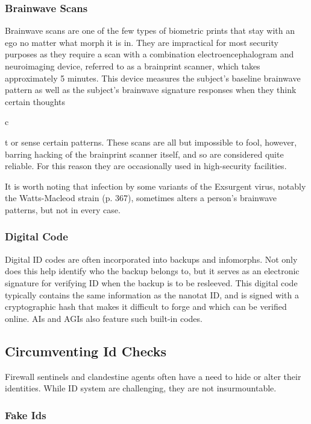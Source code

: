 \subsubsection{Brainwave Scans}

Brainwave scans are one of the few types of biometric 
prints that stay with an ego no matter what morph it 
is in. They are impractical for most security purposes 
as they require a scan with a combination electroencephalogram
and neuroimaging device, referred to as
a brainprint scanner, which takes approximately 5 
minutes. This device measures the subject's baseline 
brainwave pattern as well as the subject's brainwave 
signature responses when they think certain thoughts 

c

t
or sense certain patterns. These scans are all but 
impossible to fool, however, barring hacking of the 
brainprint scanner itself, and so are considered quite 
reliable. For this reason they are occasionally used in 
high-security facilities.

It is worth noting that infection by some variants 
of the Exsurgent virus, notably the Watts-Macleod 
strain (p. 367), sometimes alters a person's brainwave 
patterns, but not in every case.

\subsubsection{Digital Code}

Digital ID codes are often incorporated into backups and 
infomorphs. Not only does this help identify who the 
backup belongs to, but it serves as an electronic signature 
for verifying ID when the backup is to be resleeved. This 
digital code typically contains the same information as 
the nanotat ID, and is signed with a cryptographic hash 
that makes it difficult to forge and which can be verified 
online. AIs and AGIs also feature such built-in codes.

\subsection{Circumventing Id Checks}

Firewall sentinels and clandestine agents often have a 
need to hide or alter their identities. While ID system 
are challenging, they are not insurmountable.

\subsubsection{Fake Ids}

